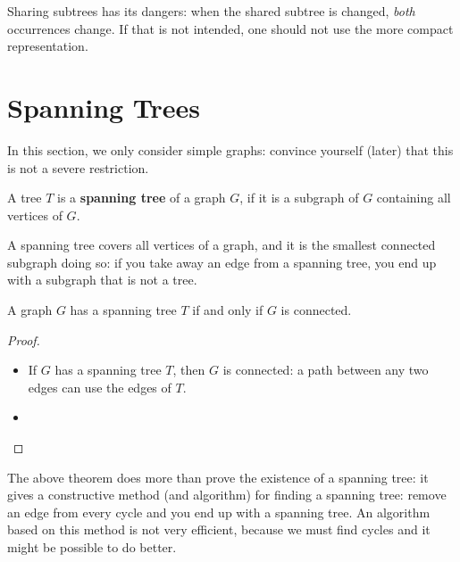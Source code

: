 Sharing subtrees has its dangers: when the shared subtree is changed,
{\em both} occurrences change. If that is not intended, one should not
use the more compact representation.

\section{Spanning Trees}

In this section, we only consider simple graphs: convince yourself
(later) that this is not a severe restriction.

 \begin{definition}
A tree \textup{$T$ is a \textbf{spanning tree} of a graph $G$,
if it is a subgraph of $G$ containing all vertices of $G$.}
\end{definition}

A spanning tree covers all vertices of a graph, and it is the smallest
connected subgraph doing so: if you take away an edge from a spanning
tree, you end up with a subgraph that is not a tree.

 \begin{theorem}
A graph $G$ has a spanning tree $T$ if and only if $G$ is connected.
\end{theorem}
\begin{proof}~\\
\begin{itemize}
\item[\fbox{$\Rightarrow$}]
If $G$ has a spanning tree $T$, then $G$ is connected: a path between
any two edges can use the edges of $T$.

\item[\fbox{$\Leftarrow$}]
\end{itemize}
\end{proof}

The above theorem does more than prove the existence of a spanning
tree: it gives a constructive method (and algorithm) for finding a
spanning tree: remove an edge from every cycle and you end up with a
spanning tree. An algorithm based on this method is not very
efficient, because we must find cycles and it might be possible to do
better.

